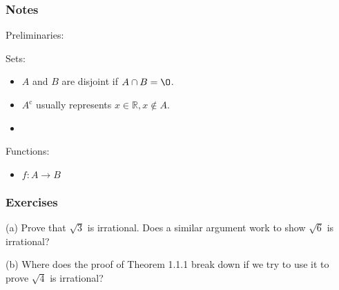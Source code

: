 \documentclass[../analysis_notes.tex]{subfiles}
\begin{document}
\subsubsection{Notes}

Preliminaries:    

Sets:
\begin{itemize}
    \item $A$ and $B$ are disjoint if $A \cap B = \O$. 
    \item $A^{\text{c}}$ usually represents ${x \in \mathbb{R}, x \not \in A}$.
    \item 
\end{itemize}

Functions:
\begin{itemize}
    \item $f: A \rightarrow B$
\end{itemize}

\hr   

\subsubsection{Exercises}

\begin{exercise}
    \indent
    (a) Prove that \( \sqrt{3} \) is irrational. Does a similar argument work to show \( \sqrt{6} \) is irrational?

    (b) Where does the proof of Theorem 1.1.1 break down if we try to use it to prove \( \sqrt{4} \) is irrational?
\end{exercise}
\end{document}
